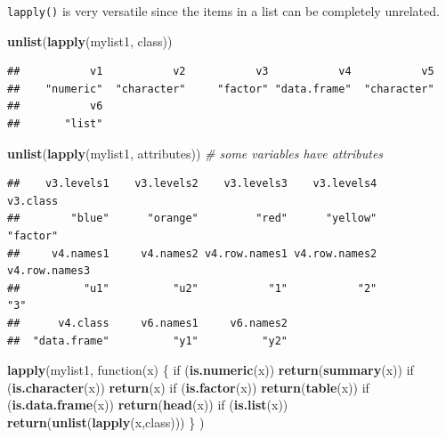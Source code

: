 \documentclass[]{book}
\newenvironment{Shaded}{\begin{snugshade}}{\end{snugshade}}
\newcommand{\KeywordTok}[1]{\textcolor[rgb]{0.13,0.29,0.53}{\textbf{{#1}}}}
\newcommand{\CommentTok}[1]{\textcolor[rgb]{0.56,0.35,0.01}{\textit{{#1}}}}
\newcommand{\NormalTok}[1]{{#1}}
\theoremstyle{definition}
\theoremstyle{definition}
\theoremstyle{remark}
\begin{document}
\texttt{lapply()} is very versatile since the items in a list can be
completely unrelated.

\begin{Shaded}
\begin{Highlighting}[]
\KeywordTok{unlist}\NormalTok{(}\KeywordTok{lapply}\NormalTok{(mylist1, class))}
\end{Highlighting}
\end{Shaded}

\begin{verbatim}
##           v1           v2           v3           v4           v5 
##    "numeric"  "character"     "factor" "data.frame"  "character" 
##           v6 
##       "list"
\end{verbatim}

\begin{Shaded}
\begin{Highlighting}[]
\KeywordTok{unlist}\NormalTok{(}\KeywordTok{lapply}\NormalTok{(mylist1, attributes))  }\CommentTok{# some variables have attributes}
\end{Highlighting}
\end{Shaded}

\begin{verbatim}
##    v3.levels1    v3.levels2    v3.levels3    v3.levels4      v3.class 
##        "blue"      "orange"         "red"      "yellow"      "factor" 
##     v4.names1     v4.names2 v4.row.names1 v4.row.names2 v4.row.names3 
##          "u1"          "u2"           "1"           "2"           "3" 
##      v4.class     v6.names1     v6.names2 
##  "data.frame"          "y1"          "y2"
\end{verbatim}

\begin{Shaded}
\begin{Highlighting}[]
\KeywordTok{lapply}\NormalTok{(mylist1, function(x) \{}
                  \NormalTok{if (}\KeywordTok{is.numeric}\NormalTok{(x)) }\KeywordTok{return}\NormalTok{(}\KeywordTok{summary}\NormalTok{(x))}
                  \NormalTok{if (}\KeywordTok{is.character}\NormalTok{(x)) }\KeywordTok{return}\NormalTok{(x)}
                  \NormalTok{if (}\KeywordTok{is.factor}\NormalTok{(x)) }\KeywordTok{return}\NormalTok{(}\KeywordTok{table}\NormalTok{(x))}
                  \NormalTok{if (}\KeywordTok{is.data.frame}\NormalTok{(x)) }\KeywordTok{return}\NormalTok{(}\KeywordTok{head}\NormalTok{(x))}
                  \NormalTok{if (}\KeywordTok{is.list}\NormalTok{(x)) }\KeywordTok{return}\NormalTok{(}\KeywordTok{unlist}\NormalTok{(}\KeywordTok{lapply}\NormalTok{(x,class)))}
                \NormalTok{\}}
\NormalTok{)}
\end{Highlighting}
\end{Shaded}
\end{document}
